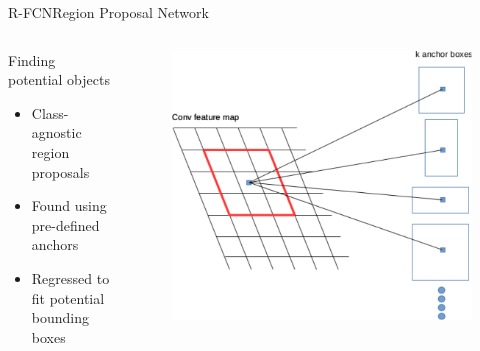 \begin{frame}{R-FCN}{Region Proposal Network}
\begin{columns}
        \begin{block}{Finding potential objects}
        \begin{itemize}
            \item Class-agnostic region proposals
            \item Found using pre-defined anchors
            \item Regressed to fit potential bounding boxes
        \end{itemize}
    \end{block}
        \begin{figure}
            \includegraphics[width=1.0 \textwidth]{figs/rpn.pdf}
        \end{figure}
    \end{columns}
\end{frame}

